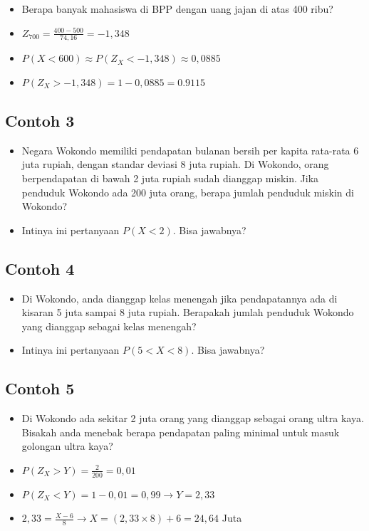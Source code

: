\documentclass[
  letterpaper,
  DIV=11,
  numbers=noendperiod]{scrartcl}
\begin{document}
\begin{itemize}
\item
  Berapa banyak mahasiswa di BPP dengan uang jajan di atas 400 ribu?
\item
  \(Z_{700}=\frac{400-500}{74,16}=-1,348\)
\item
  \(P(X<600) \approx P(Z_X<-1,348) \approx 0,0885\)
\item
  \(P(Z_X>-1,348)=1-0,0885=0.9115\)
\end{itemize}

\hypertarget{contoh-3-1}{%
\subsection{Contoh 3}\label{contoh-3-1}}

\begin{itemize}
\item
  Negara Wokondo memiliki pendapatan bulanan bersih per kapita rata-rata
  6 juta rupiah, dengan standar deviasi 8 juta rupiah. Di Wokondo, orang
  berpendapatan di bawah 2 juta rupiah sudah dianggap miskin. Jika
  penduduk Wokondo ada 200 juta orang, berapa jumlah penduduk miskin di
  Wokondo?
\item
  Intinya ini pertanyaan \(P(X<2)\). Bisa jawabnya?
\end{itemize}

\hypertarget{contoh-4-1}{%
\subsection{Contoh 4}\label{contoh-4-1}}

\begin{itemize}
\item
  Di Wokondo, anda dianggap kelas menengah jika pendapatannya ada di
  kisaran 5 juta sampai 8 juta rupiah. Berapakah jumlah penduduk Wokondo
  yang dianggap sebagai kelas menengah?
\item
  Intinya ini pertanyaan \(P(5<X<8)\). Bisa jawabnya?
\end{itemize}

\hypertarget{contoh-5-1}{%
\subsection{Contoh 5}\label{contoh-5-1}}

\begin{itemize}
\item
  Di Wokondo ada sekitar 2 juta orang yang dianggap sebagai orang ultra
  kaya. Bisakah anda menebak berapa pendapatan paling minimal untuk
  masuk golongan ultra kaya?
\item
  \(P(Z_X > Y) = \frac{2}{200}=0,01\)
\item
  \(P(Z_X < Y) = 1-0,01=0,99 \rightarrow Y=2,33\)
\item
  \(2,33=\frac{X-6}{8} \rightarrow X=(2,33 \times 8 ) + 6 = 24,64\) Juta
\end{itemize}
\end{document}

